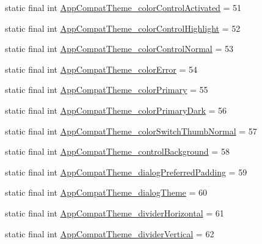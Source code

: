 \begin{DoxyCompactItemize}
\item 
static final int \mbox{\hyperlink{classandroid_1_1support_1_1design_1_1_r_1_1styleable_a3176966cea8de8860d7df6122ddf9854}{App\+Compat\+Theme\+\_\+color\+Control\+Activated}} = 51
\item 
static final int \mbox{\hyperlink{classandroid_1_1support_1_1design_1_1_r_1_1styleable_ab90e967a5234f11e88352c2e1d537b67}{App\+Compat\+Theme\+\_\+color\+Control\+Highlight}} = 52
\item 
static final int \mbox{\hyperlink{classandroid_1_1support_1_1design_1_1_r_1_1styleable_a64e62e2f99c16432ef0a704f5888208e}{App\+Compat\+Theme\+\_\+color\+Control\+Normal}} = 53
\item 
static final int \mbox{\hyperlink{classandroid_1_1support_1_1design_1_1_r_1_1styleable_a6d33a84af081e00a501d60b046e7b26c}{App\+Compat\+Theme\+\_\+color\+Error}} = 54
\item 
static final int \mbox{\hyperlink{classandroid_1_1support_1_1design_1_1_r_1_1styleable_aadbffa0cde40a0a96eb461773f8f19e8}{App\+Compat\+Theme\+\_\+color\+Primary}} = 55
\item 
static final int \mbox{\hyperlink{classandroid_1_1support_1_1design_1_1_r_1_1styleable_a5e20a3f3a98801e00d114c832a698b2b}{App\+Compat\+Theme\+\_\+color\+Primary\+Dark}} = 56
\item 
static final int \mbox{\hyperlink{classandroid_1_1support_1_1design_1_1_r_1_1styleable_a716d45a0bfce470c02a27ffe80e29729}{App\+Compat\+Theme\+\_\+color\+Switch\+Thumb\+Normal}} = 57
\item 
static final int \mbox{\hyperlink{classandroid_1_1support_1_1design_1_1_r_1_1styleable_a7a0671fcf24cdc7e14d4e70bd11e54ca}{App\+Compat\+Theme\+\_\+control\+Background}} = 58
\item 
static final int \mbox{\hyperlink{classandroid_1_1support_1_1design_1_1_r_1_1styleable_a5670a4513692089b51e1279d930541d6}{App\+Compat\+Theme\+\_\+dialog\+Preferred\+Padding}} = 59
\item 
static final int \mbox{\hyperlink{classandroid_1_1support_1_1design_1_1_r_1_1styleable_a21b5a4bac4dc5bcdeabfc9924f1f08fd}{App\+Compat\+Theme\+\_\+dialog\+Theme}} = 60
\item 
static final int \mbox{\hyperlink{classandroid_1_1support_1_1design_1_1_r_1_1styleable_a0bdb863059d6bfde1cebce0da32f4271}{App\+Compat\+Theme\+\_\+divider\+Horizontal}} = 61
\item 
static final int \mbox{\hyperlink{classandroid_1_1support_1_1design_1_1_r_1_1styleable_a669f031564979a797666db445c79e92a}{App\+Compat\+Theme\+\_\+divider\+Vertical}} = 62

\end{DoxyCompactItemize}
